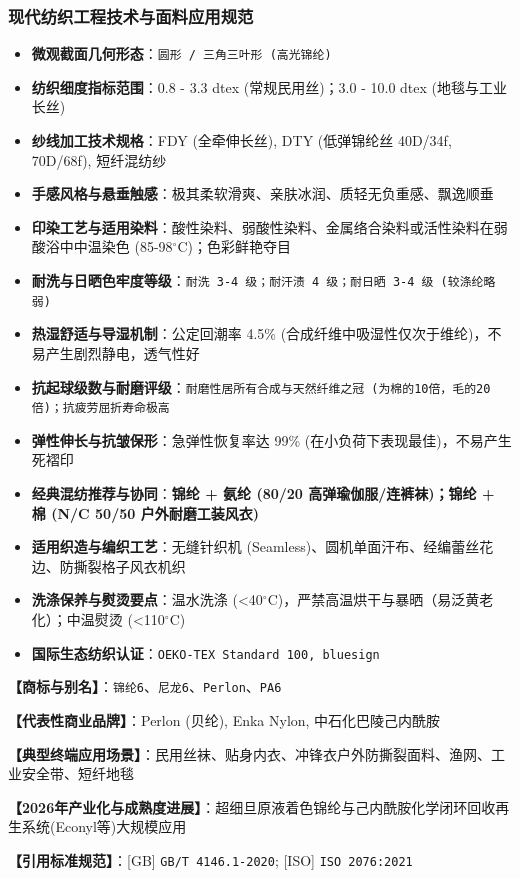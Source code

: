 \documentclass[11pt,openright,twoside,UTF8]{ctexbook}
\begin{document}
\subsubsection*{现代纺织工程技术与面料应用规范}
\begin{itemize} \setlength{\itemsep}{2pt}
    \item \textbf{微观截面几何形态}：\texttt{圆形 / 三角三叶形 (高光锦纶)}
    \item \textbf{纺织细度指标范围}：0.8 - 3.3 dtex (常规民用丝)；3.0 - 10.0 dtex (地毯与工业长丝)
    \item \textbf{纱线加工技术规格}：FDY (全牵伸长丝), DTY (低弹锦纶丝 40D/34f, 70D/68f), 短纤混纺纱
    \item \textbf{手感风格与悬垂触感}：极其柔软滑爽、亲肤冰润、质轻无负重感、飘逸顺垂
    \item \textbf{印染工艺与适用染料}：酸性染料、弱酸性染料、金属络合染料或活性染料在弱酸浴中中温染色 (85-98$^\circ\mathrm{C}$)；色彩鲜艳夺目
    \item \textbf{耐洗与日晒色牢度等级}：\texttt{耐洗 3-4 级；耐汗渍 4 级；耐日晒 3-4 级 (较涤纶略弱)}
    \item \textbf{热湿舒适与导湿机制}：公定回潮率 4.5\% (合成纤维中吸湿性仅次于维纶)，不易产生剧烈静电，透气性好
    \item \textbf{抗起球级数与耐磨评级}：\texttt{耐磨性居所有合成与天然纤维之冠 (为棉的10倍，毛的20倍)；抗疲劳屈折寿命极高}
    \item \textbf{弹性伸长与抗皱保形}：急弹性恢复率达 99\% (在小负荷下表现最佳)，不易产生死褶印
    \item \textbf{经典混纺推荐与协同}：\textbf{锦纶 + 氨纶 (80/20 高弹瑜伽服/连裤袜)；锦纶 + 棉 (N/C 50/50 户外耐磨工装风衣)}
    \item \textbf{适用织造与编织工艺}：无缝针织机 (Seamless)、圆机单面汗布、经编蕾丝花边、防撕裂格子风衣机织
    \item \textbf{洗涤保养与熨烫要点}：温水洗涤 (\textless{}40$^\circ\mathrm{C}$)，严禁高温烘干与暴晒（易泛黄老化）；中温熨烫 (\textless{}110$^\circ\mathrm{C}$)
    \item \textbf{国际生态纺织认证}：\texttt{OEKO-TEX Standard 100, bluesign}
\end{itemize}
\vspace{0.2cm}

\noindent\textbf{【商标与别名】}：\texttt{锦纶6}、\texttt{尼龙6}、\texttt{Perlon}、\texttt{PA6}\par
\noindent\textbf{【代表性商业品牌】}：Perlon (贝纶), Enka Nylon, 中石化巴陵己内酰胺\par
\noindent\textbf{【典型终端应用场景】}：民用丝袜、贴身内衣、冲锋衣户外防撕裂面料、渔网、工业安全带、短纤地毯\par
\noindent\textbf{【2026年产业化与成熟度进展】}：超细旦原液着色锦纶与己内酰胺化学闭环回收再生系统(Econyl等)大规模应用\par
\noindent\textbf{【引用标准规范】}：[GB] \texttt{GB/T 4146.1-2020}; [ISO] \texttt{ISO 2076:2021}\par
\vspace{0.5cm}
\end{document}
